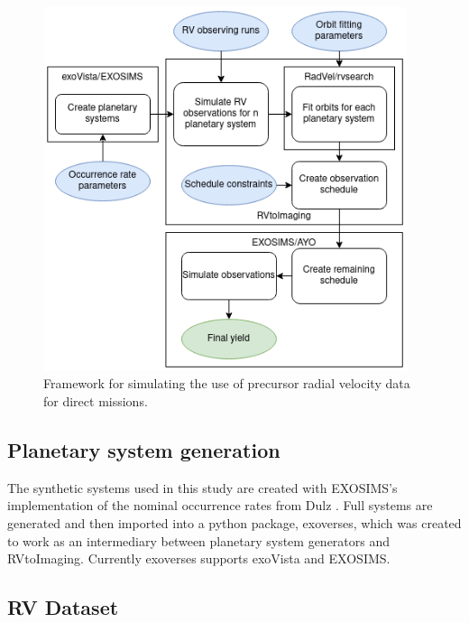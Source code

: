 \begin{figure}
  \begin{center}
    \includegraphics[width=0.95\textwidth]{ch4/figures/flowchartwhite.png}
  \end{center}
  \caption{Framework for simulating the use of precursor radial velocity data
  for direct missions.}
  \label{fig:rv2imgflowchart}
\end{figure}


\subsection{Planetary system generation}

The synthetic systems used in this study are created with EXOSIMS's
implementation of the nominal occurrence rates from Dulz \citep{dulzJointRadialVelocity2020}. Full systems
are generated and then imported into a python package, exoverses, which was
created to work as an intermediary between planetary system generators and
RVtoImaging. Currently exoverses supports exoVista and EXOSIMS.

\subsection{RV Dataset}

